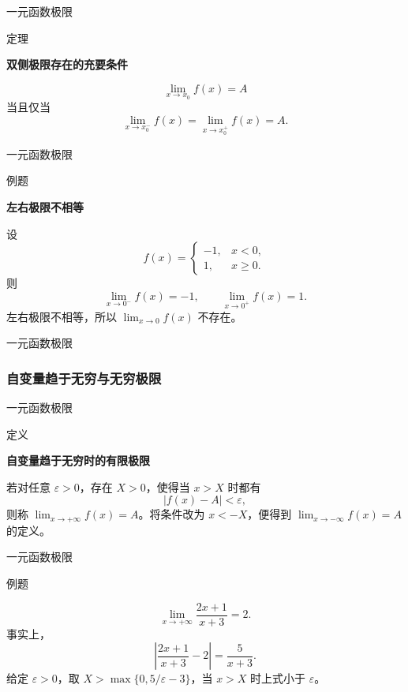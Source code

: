 \documentclass[aspectratio=169,10pt,fontset=fandol]{ctexbeamer}
\begin{document}
\begin{frame}[t,fragile]{一元函数极限}
\normalsize
\begin{block}{定理}
{\normalsize
\textbf{双侧极限存在的充要条件}\par

\[
\lim_{x\to x_0}f(x)=A
\]
当且仅当
\[
\lim_{x\to x_0^-}f(x)=\lim_{x\to x_0^+}f(x)=A.
\]

}
\end{block}
\end{frame}
\begin{frame}[t,fragile]{一元函数极限}
\normalsize
\begin{block}{例题}
{\normalsize
\textbf{左右极限不相等}\par

设
\[
f(x)=
\begin{cases}
-1,&x<0,\\
1,&x\geq0.
\end{cases}
\]
则
\[
\lim_{x\to0^-}f(x)=-1,\qquad
\lim_{x\to0^+}f(x)=1.
\]
左右极限不相等，所以 \(\lim_{x\to0}f(x)\) 不存在。

}
\end{block}
\end{frame}
\begin{frame}[t,fragile]{一元函数极限}
\normalsize
{\normalsize
\subsubsection*{自变量趋于无穷与无穷极限}


}
\end{frame}
\begin{frame}[t,fragile]{一元函数极限}
\normalsize
\begin{block}{定义}
{\normalsize
\textbf{自变量趋于无穷时的有限极限}\par

若对任意 \(\varepsilon>0\)，存在 \(X>0\)，使得当 \(x>X\) 时都有
\[
|f(x)-A|<\varepsilon,
\]
则称 \(\lim_{x\to+\infty}f(x)=A\)。将条件改为 \(x<-X\)，便得到 \(\lim_{x\to-\infty}f(x)=A\) 的定义。

}
\end{block}
\end{frame}
\begin{frame}[t,fragile]{一元函数极限}
\normalsize
\begin{block}{例题}
{\normalsize
\[
\lim_{x\to+\infty}\frac{2x+1}{x+3}=2.
\]
事实上，
\[
\left|\frac{2x+1}{x+3}-2\right|=\frac5{x+3}.
\]
给定 \(\varepsilon>0\)，取 \(X>\max\{0,5/\varepsilon-3\}\)，当 \(x>X\) 时上式小于 \(\varepsilon\)。

}
\end{block}
\end{frame}
\end{document}
